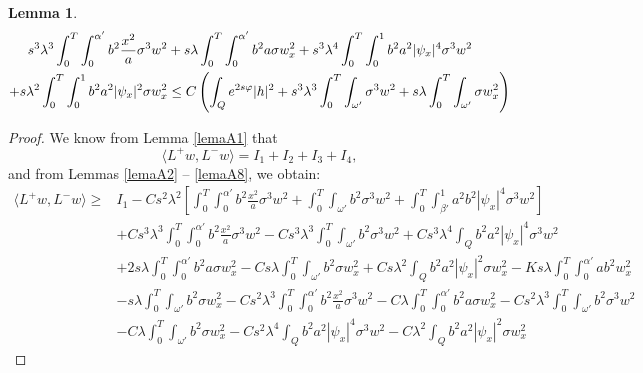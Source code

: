 \documentclass[11pt,oneside,a4papper]{osajnl}
\newtheorem{lema}{Lemma}
\begin{document}
\begin{lema}\label{lemaA9}
	\begin{multline*}
		\hspace*{-0.5cm}s^3 \lambda^3 \int_0^T \int_0^{\alpha'} b^2 \frac{x^2}{a} \sigma^3 w^2 + s\lambda \int_0^T \int_0^{\alpha'} b^2 a \sigma w_x^2 + s^3\lambda^4 \int_0^T \int_0^1 b^2 a^2 |\psi_x|^4 \sigma^3 w^2 \\
		+ s\lambda^2 \int_0^T \int_0^1 b^2 a^2 |\psi_x|^2 \sigma w_x^2 
		\leq C \left(\int_Q e^{2s\varphi} |h|^2 + s^3\lambda^3 \int_0^T \int_{\omega'} \sigma^3 w^2 + s\lambda \int_0^T \int_{\omega'} \sigma w_x^2 \right)
	\end{multline*}
\end{lema}
\begin{proof}
	We know from Lemma \ref{lemaA1} that
	$$\langle L^+ w,L^- w \rangle =I_1+I_2+I_3+I_4,$$
	and from Lemmas \ref{lemaA2} --  \ref{lemaA8}, we  obtain:
    \begin{equation*}
    \begin{split}
		\langle L^+ w,L^- w \rangle \geq &I_1-Cs^2\lambda^2\left[ \int_{0}^{T} \int_{0}^{\alpha'} b^2 \frac{x^2}{a} \sigma^3 w^2 +  \int_{0}^{T} \int_{\omega'}b^2  \sigma^3 w^2+\int_{0}^{T} \int_{\beta'}^{1}a^2b^2 |\psi_x|^4 \sigma^3 w^2 \right]\\
		&+ C s^3 \lambda^3 \int_0^T \int_0^{\alpha'} b^2 \frac{x^2}{a} \sigma^3 w^2 - Cs^3\lambda^3 \int_0^T\int_{\omega'} b^2 \sigma^3 w^2 + C s^3 \lambda^4 \int_Q b^2 a^2 |\psi_x|^4 \sigma^3 w^2\\
        &+2 s \lambda \int_0^T \int_0^{\alpha'} b^2 a \sigma w_x^2 - C s\lambda \int_0^T\int_{\omega'} b^2 \sigma w_x^2 + C s \lambda^2 \int_Q b^2 a^2 |\psi_x|^2 \sigma w_x^2-Ks\lambda \int_0^T \int_0^{\alpha'} ab^2   w_x^2 \\
        &-  s\lambda\int_0^T\int_{\omega'} b^2  \sigma w_x^2 - C s^2\lambda^3 \int_0^T \int_0^{\alpha'} b^2 \frac{x^2}{a}  \sigma^3 w^2 - C \lambda \int_0^T \int_0^{\alpha'} b^2 a \sigma w_x^2 - Cs^2\lambda^3 \int_0^T\int_{\omega'} b^2 \sigma^3 w^2 \\
        &- C\lambda \int_0^T\int_{\omega'} b^2 \sigma w_x^2 -Cs^2\lambda^4 \int_Q b^2 a^2 |\psi_x|^4 \sigma^3 w^2 - C\lambda^2 \int_Q b^2 a^2|\psi_x|^2\sigma w_x^2    
    \end{split}
    \end{equation*}

\end{proof}
\end{document}
